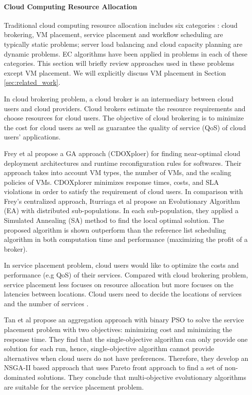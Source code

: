 \paragraph{Cloud Computing Resource Allocation}
Traditional cloud computing resource allocation includes six categories \cite{Guzek:2015ds}: cloud brokering, VM placement, service placement and workflow scheduling are typically static problems; server load balancing and cloud capacity planning are dynamic problems. EC algorithms have been applied in problems in each of these categories. This section will briefly review approaches used in these problems except VM placement. We will explicitly discuss VM placement in Section \ref{sec:related_work}.

\vspace{5mm}

In cloud brokering problem, a cloud broker is an intermediary between cloud users and cloud providers. Cloud brokers estimate the resource requirements and choose resources for cloud users. The objective of cloud brokering is to minimize the cost for cloud users as well as guarantee the quality of service (QoS) of cloud users' applications.

Frey et al \cite{Frey:2013gp} propose a GA approach (CDOXploer) for finding near-optimal cloud deployment architectures and runtime reconfiguration rules for softwares. Their approach takes into account VM types, the number of VMs, and the scaling policies of VMs. CDOXplorer minimizes response times, costs, and SLA violations in order to satisfy the requirement of cloud users.  In comparison with Frey's centralized approach, Iturriaga et al \cite{6681297} propose an Evolutionary Algorithm (EA) with distributed sub-populations. In each sub-population, they applied a Simulated Annealing (SA) method to find the local optimal solution. The proposed algorithm is shown outperform than the reference list scheduling algorithm in both computation time and performance (maximizing the profit of a broker).

\vspace{5mm}

In service placement problem, cloud users would like to optimize the costs and performance (e.g QoS) of their services. Compared with cloud brokering problem, service placement less focuses on resource allocation but more focuses on the latencies between locations. Cloud users need to decide the locations of services and the number of services \cite{Guzek:2015ds}. 

Tan et al \cite{Tan2017} propose an aggregation approach with binary PSO to solve the service placement problem with two objectives: minimizing cost and minimizing the response time. They find that the single-objective algorithm can only provide one solution for each run, hence, single-objective algorithm cannot provide alternatives when cloud users do not have preferences. Therefore, they develop an NSGA-II based approach \cite{Tan2016} that uses Pareto front approach to find a set of non-dominated solutions. They conclude that multi-objective evolutionary algorithms are suitable for the service placement problem.

